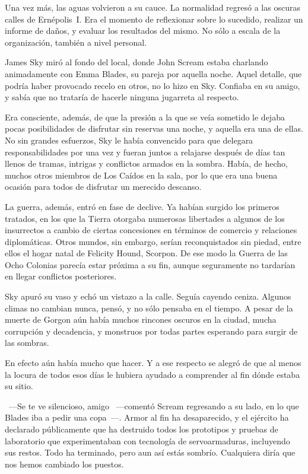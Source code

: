 Una vez más, las aguas volvieron a su cauce. La normalidad regresó a las oscuras calles de Ernépolis~I. Era el momento de reflexionar sobre lo sucedido, realizar un informe de daños, y evaluar los resultados del mismo. No sólo a escala de la organización, también a nivel personal.

\fancyparbreak
James Sky miró al fondo del local, donde John Scream estaba charlando animadamente con Emma Blades, su pareja por aquella noche. Aquel detalle, que podría haber provocado recelo en otros, no lo hizo en Sky. Confiaba en su amigo, y sabía que no trataría de hacerle ninguna jugarreta al respecto.

Era consciente, además, de que la presión a la que se veía sometido le dejaba pocas posibilidades de disfrutar sin reservas una noche, y aquella era una de ellas. No sin grandes esfuerzos, Sky le había convencido para que delegara responsabilidades por una vez y fueran juntos a relajarse después de días tan llenos de tramas, intrigas y conflictos armados en la sombra. Había, de hecho, muchos otros miembros de Los Caídos en la sala, por lo que era una buena ocasión para todos de disfrutar un merecido descanso.

La guerra, además, entró en fase de declive. Ya habían surgido los primeros tratados, en los que la Tierra otorgaba numerosas libertades a algunos de los insurrectos a cambio de ciertas concesiones en términos de comercio y relaciones diplomáticas. Otros mundos, sin embargo, serían reconquistados sin piedad, entre ellos el hogar natal de Felicity Hound, Scorpon. De ese modo la Guerra de las Ocho Colonias parecía estar próxima a su fin, aunque seguramente no tardarían en llegar conflictos posteriores.

Sky apuró su vaso y echó un vistazo a la calle. Seguía cayendo ceniza. Algunos climas no cambian nunca, pensó, y no sólo pensaba en el tiempo. A pesar de la muerte de Gorgon aún había muchos rincones oscuros en la ciudad, mucha corrupción y decadencia, y monstruos por todas partes esperando para surgir de las sombras.

En efecto aún había mucho que hacer. Y a ese respecto se alegró de que al menos la locura de todos esos días le hubiera ayudado a comprender al fin dónde estaba su sitio.

~---Se te ve silencioso, amigo ~---comentó Scream regresando a su lado, en lo que Blades iba a pedir una copa~---. Armor al fin ha desaparecido, y el ejército ha declarado públicamente que ha destruido todos los prototipos y pruebas de laboratorio que experimentaban con tecnología de servoarmaduras, incluyendo sus restos. Todo ha terminado, pero aun así estás sombrío. Cualquiera diría que nos hemos cambiado los puestos.

